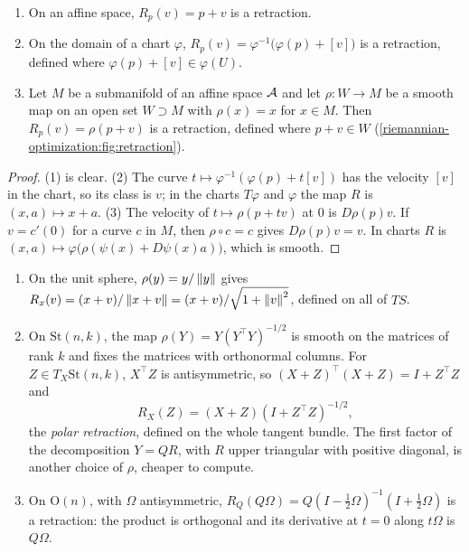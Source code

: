 \begin{notechapter}
\begin{proposition}
\label{riemannian-optimization:prop:retractions}
\begin{enumerate}[nosep]
  \item On an affine space, $R_p(v) = p + v$ is a retraction.
  \item On the domain of a chart $\varphi$,
        $R_p(v) = \varphi^{-1}\bigl(\varphi(p) + [v]\bigr)$ is a
        retraction, defined where $\varphi(p) + [v]\in\varphi(U)$.
  \item Let $M$ be a submanifold of an affine space $\mathcal{A}$ and let
        $\rho:W\to M$ be a smooth map on an open set $W\supset M$ with
        $\rho(x) = x$ for $x\in M$. Then $R_p(v) = \rho(p + v)$ is a
        retraction, defined where $p + v\in W$
        (\cref{riemannian-optimization:fig:retraction}).
\end{enumerate}
\end{proposition}

\begin{proof}
(1) is clear. (2) The curve $t\mapsto\varphi^{-1}(\varphi(p) + t[v])$ has
the velocity $[v]$ in the chart, so its class is $v$; in the charts
$T\varphi$ and $\varphi$ the map $R$ is $(x, a)\mapsto x + a$. (3) The
velocity of $t\mapsto\rho(p + tv)$ at $0$ is $D\rho(p)v$. If $v = c'(0)$
for a curve $c$ in $M$, then $\rho\circ c = c$ gives $D\rho(p)v = v$. In
charts $R$ is $(x, a)\mapsto\varphi\bigl(\rho(\psi(x) + D\psi(x)a)\bigr)$,
which is smooth.
\end{proof}

\begin{example}
\label{riemannian-optimization:ex:retractions}
\begin{enumerate}[nosep]
  \item On the unit sphere, $\rho(y) = y/\left\|y\right\|$ gives
        $R_x(v) = (x + v)/\left\|x + v\right\| = (x + v)/\sqrt{1 + \left\|v\right\|^2}$,
        defined on all of $TS$.
  \item On $\mathrm{St}(n, k)$, the map
        $\rho(Y) = Y(Y^\top Y)^{-1/2}$ is smooth on the matrices of rank
        $k$ and fixes the matrices with orthonormal columns. For
        $Z\in T_X\mathrm{St}(n, k)$, $X^\top Z$ is antisymmetric, so
        $(X + Z)^\top(X + Z) = I + Z^\top Z$ and
        \[
          R_X(Z) = (X + Z)(I + Z^\top Z)^{-1/2} ,
        \]
        the \emph{polar retraction}, defined on the whole tangent bundle.
        The first factor of the decomposition $Y = QR$, with $R$ upper
        triangular with positive diagonal, is another choice of $\rho$,
        cheaper to compute.
  \item On $\mathrm O(n)$, with $\Omega$ antisymmetric,
        $R_Q(Q\Omega) = Q(I - \frac12\Omega)^{-1}(I + \frac12\Omega)$ is a
        retraction: the product is orthogonal and its derivative at
        $t = 0$ along $t\Omega$ is $Q\Omega$.
\end{enumerate}
\end{example}


\end{notechapter}
